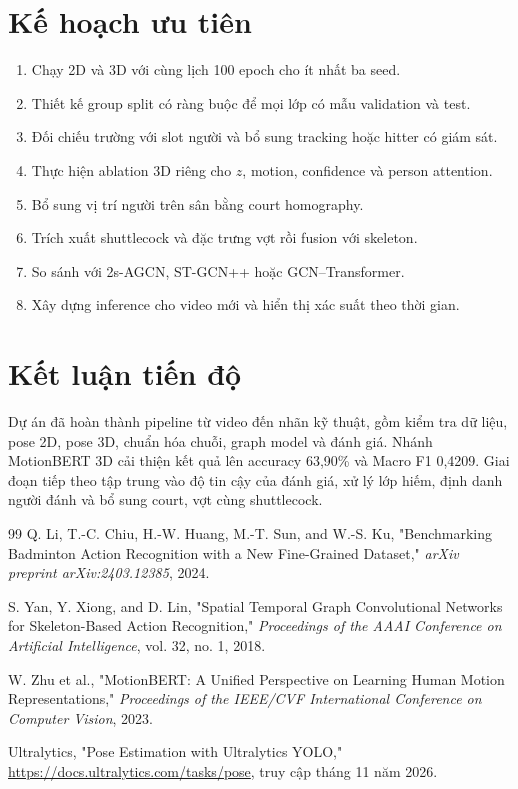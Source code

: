 \documentclass[12pt,a4paper,oneside]{report}
\newcommand{\code}[1]{\texttt{\detokenize{#1}}}
\begin{document}
\section{Kế hoạch ưu tiên}

\begin{enumerate}
\item Chạy 2D và 3D với cùng lịch 100 epoch cho ít nhất ba seed.
\item Thiết kế group split có ràng buộc để mọi lớp có mẫu validation và test.
\item Đối chiếu trường \code{player} với slot người và bổ sung tracking hoặc hitter có giám sát.
\item Thực hiện ablation 3D riêng cho $z$, motion, confidence và person attention.
\item Bổ sung vị trí người trên sân bằng court homography.
\item Trích xuất shuttlecock và đặc trưng vợt rồi fusion với skeleton.
\item So sánh với 2s-AGCN, ST-GCN++ hoặc GCN--Transformer.
\item Xây dựng inference cho video mới và hiển thị xác suất theo thời gian.
\end{enumerate}

\section{Kết luận tiến độ}

Dự án đã hoàn thành pipeline từ video đến nhãn kỹ thuật, gồm kiểm tra dữ liệu, pose 2D, pose 3D, chuẩn hóa chuỗi, graph model và đánh giá. Nhánh MotionBERT 3D cải thiện kết quả lên accuracy 63,90\% và Macro F1 0,4209. Giai đoạn tiếp theo tập trung vào độ tin cậy của đánh giá, xử lý lớp hiếm, định danh người đánh và bổ sung court, vợt cùng shuttlecock.

\begin{thebibliography}{99}
Q. Li, T.-C. Chiu, H.-W. Huang, M.-T. Sun, and W.-S. Ku,
"Benchmarking Badminton Action Recognition with a New Fine-Grained Dataset,"
\textit{arXiv preprint arXiv:2403.12385}, 2024.

S. Yan, Y. Xiong, and D. Lin,
"Spatial Temporal Graph Convolutional Networks for Skeleton-Based Action Recognition,"
\textit{Proceedings of the AAAI Conference on Artificial Intelligence},
vol. 32, no. 1, 2018.

W. Zhu et al.,
"MotionBERT: A Unified Perspective on Learning Human Motion Representations,"
\textit{Proceedings of the IEEE/CVF International Conference on Computer Vision},
2023.

Ultralytics, "Pose Estimation with Ultralytics YOLO,"
\url{https://docs.ultralytics.com/tasks/pose},
truy cập tháng 11 năm 2026.
\end{thebibliography}
\end{document}
